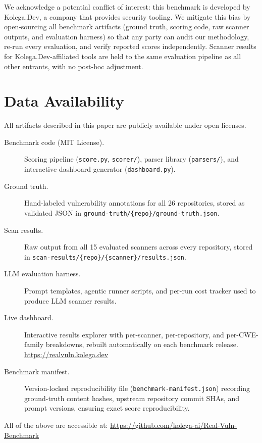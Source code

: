 We acknowledge a potential conflict of interest: this benchmark is developed by
Kolega.Dev, a company that provides security tooling.  We mitigate this bias by
open-sourcing all benchmark artifacts (ground truth, scoring code, raw
scanner outputs, and evaluation harness) so that any party can audit our
methodology, re-run every evaluation, and verify reported scores independently.
Scanner results for Kolega.Dev-affiliated tools are held to the same evaluation
pipeline as all other entrants, with no post-hoc adjustment.

\section{Data Availability}

All artifacts described in this paper are publicly available under open licenses.

\begin{description}
  \item[Benchmark code (MIT License).]
    Scoring pipeline (\texttt{score.py}, \texttt{scorer/}), parser library
    (\texttt{parsers/}), and interactive dashboard generator
    (\texttt{dashboard.py}).

  \item[Ground truth.]
    Hand-labeled vulnerability annotations for all 26 repositories, stored as
    validated JSON in \texttt{ground-truth/\{repo\}/ground-truth.json}.

  \item[Scan results.]
    Raw output from all 15 evaluated scanners across every repository, stored
    in \texttt{scan-results/\{repo\}/\{scanner\}/results.json}.

  \item[LLM evaluation harness.]
    Prompt templates, agentic runner scripts, and per-run cost
    tracker used to produce LLM scanner results.

  \item[Live dashboard.]
    Interactive results explorer with per-scanner, per-repository, and
    per-CWE-family breakdowns, rebuilt automatically on each benchmark release.
    \url{https://realvuln.kolega.dev}

  \item[Benchmark manifest.]
    Version-locked reproducibility file (\texttt{benchmark-manifest.json})
    recording ground-truth content hashes, upstream repository commit SHAs,
    and prompt versions, ensuring exact score reproducibility.
\end{description}

\noindent All of the above are accessible at:
\url{https://github.com/kolega-ai/Real-Vuln-Benchmark}
